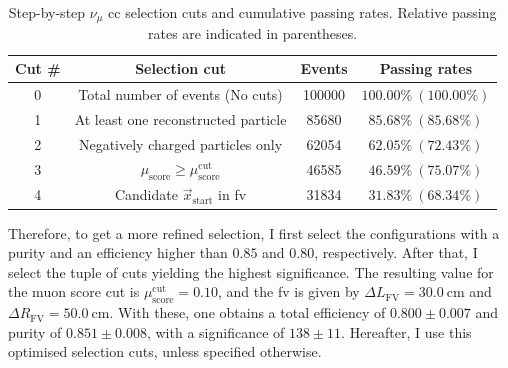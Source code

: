 \begin{table}[h!]
	\caption[Step-by-step $\nu_{\mu}$ \gls{cc} selection cuts and cumulative passing rates.]{Step-by-step $\nu_{\mu}$ \gls{cc} selection cuts and cumulative passing rates. Relative passing rates are indicated in parentheses.}
	\begin{center}
		\begin{small}
			\begin{tabular}{c|ccc}
                Cut \# & Selection cut                       & Events & Passing rates          \\[2mm] \hline
                \rule{0pt}{1.1\normalbaselineskip}0      & Total number of events (No cuts)    & 100000 & $100.00\% ~(100.00\%)$ \\[2mm]
                1      & At least one reconstructed particle                              & 85680  & $85.68 \% ~(85.68 \%)$ \\[2mm]
                2      & Negatively charged particles only                                & 62054  & $62.05\% ~(72.43\%)$   \\[2mm]
                3      & $\mu_{\mathrm{score}} \geq \mu_{\mathrm{score}}^{\mathrm{cut}}$  & 46585  & $46.59\% ~(75.07\%)$   \\[2mm]
                4      & Candidate $\vec{x}_{\mathrm{start}}$ in \gls{fv}                       & 31834  & $31.83\% ~(68.34\%)$  
                \end{tabular}
		\end{small}
	\end{center}
	\label{tab:numuCC_selection}
\end{table}

Therefore, to get a more refined selection, I first select the configurations with a purity and an efficiency higher than $0.85$ and $0.80$, respectively. After that, I select the tuple of cuts yielding the highest significance. The resulting value for the muon score cut is $\mu_{\mathrm{score}}^{\mathrm{cut}} = 0.10$, and the \gls{fv} is given by $\Delta L_{\mathrm{FV}} = 30.0~\mathrm{cm}$ and $\Delta R_{\mathrm{FV}} = 50.0~\mathrm{cm}$. With these, one obtains a total efficiency of $0.800 \pm 0.007$ and purity of $0.851 \pm 0.008$, with a significance of $138 \pm 11$. Hereafter, I use this optimised selection cuts, unless specified otherwise.

